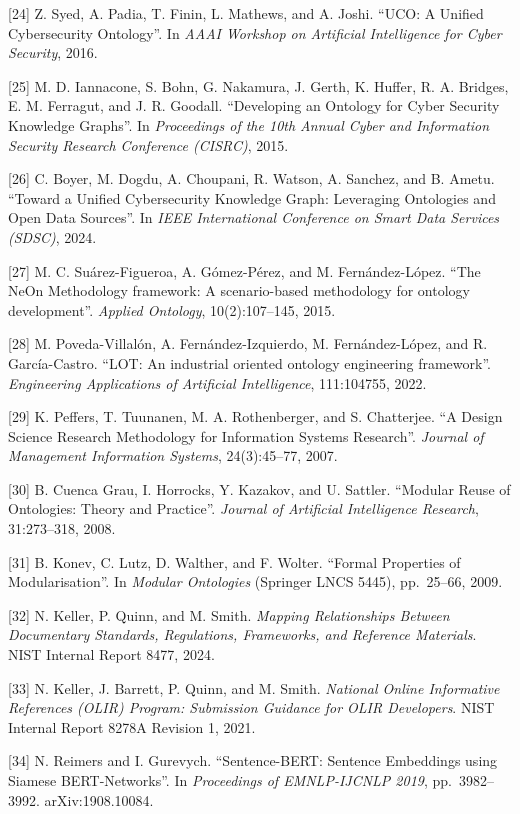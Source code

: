 \documentclass[
]{article}
\begin{document}
{[}24{]} Z. Syed, A. Padia, T. Finin, L. Mathews, and A. Joshi. ``UCO: A
Unified Cybersecurity Ontology''. In \emph{AAAI Workshop on Artificial
Intelligence for Cyber Security}, 2016.

{[}25{]} M. D. Iannacone, S. Bohn, G. Nakamura, J. Gerth, K. Huffer, R.
A. Bridges, E. M. Ferragut, and J. R. Goodall. ``Developing an Ontology
for Cyber Security Knowledge Graphs''. In \emph{Proceedings of the 10th
Annual Cyber and Information Security Research Conference (CISRC)},
2015.

{[}26{]} C. Boyer, M. Dogdu, A. Choupani, R. Watson, A. Sanchez, and B.
Ametu. ``Toward a Unified Cybersecurity Knowledge Graph: Leveraging
Ontologies and Open Data Sources''. In \emph{IEEE International
Conference on Smart Data Services (SDSC)}, 2024.

{[}27{]} M. C. Suárez-Figueroa, A. Gómez-Pérez, and M. Fernández-López.
``The NeOn Methodology framework: A scenario-based methodology for
ontology development''. \emph{Applied Ontology}, 10(2):107--145, 2015.

{[}28{]} M. Poveda-Villalón, A. Fernández-Izquierdo, M. Fernández-López,
and R. García-Castro. ``LOT: An industrial oriented ontology engineering
framework''. \emph{Engineering Applications of Artificial Intelligence},
111:104755, 2022.

{[}29{]} K. Peffers, T. Tuunanen, M. A. Rothenberger, and S. Chatterjee.
``A Design Science Research Methodology for Information Systems
Research''. \emph{Journal of Management Information Systems},
24(3):45--77, 2007.

{[}30{]} B. Cuenca Grau, I. Horrocks, Y. Kazakov, and U. Sattler.
``Modular Reuse of Ontologies: Theory and Practice''. \emph{Journal of
Artificial Intelligence Research}, 31:273--318, 2008.

{[}31{]} B. Konev, C. Lutz, D. Walther, and F. Wolter. ``Formal
Properties of Modularisation''. In \emph{Modular Ontologies} (Springer
LNCS 5445), pp.~25--66, 2009.

{[}32{]} N. Keller, P. Quinn, and M. Smith. \emph{Mapping Relationships
Between Documentary Standards, Regulations, Frameworks, and Reference
Materials}. NIST Internal Report 8477, 2024.

{[}33{]} N. Keller, J. Barrett, P. Quinn, and M. Smith. \emph{National
Online Informative References (OLIR) Program: Submission Guidance for
OLIR Developers}. NIST Internal Report 8278A Revision 1, 2021.

{[}34{]} N. Reimers and I. Gurevych. ``Sentence-BERT: Sentence
Embeddings using Siamese BERT-Networks''. In \emph{Proceedings of
EMNLP-IJCNLP 2019}, pp.~3982--3992. arXiv:1908.10084.
\end{document}
